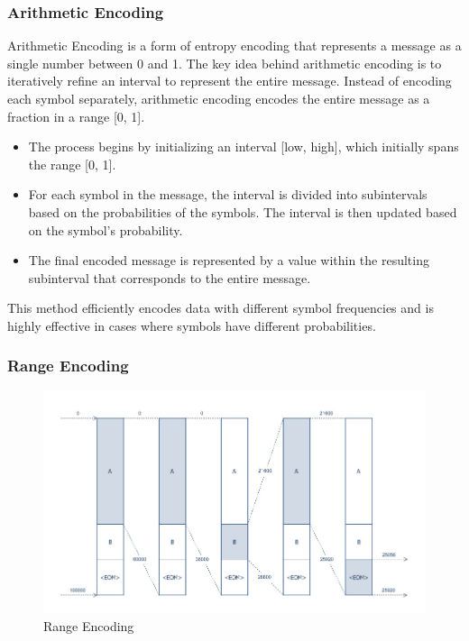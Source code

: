     \subsubsection{Arithmetic Encoding}
    Arithmetic Encoding is a form of entropy encoding that represents a message as a single number between 0 and 1. The key idea behind arithmetic encoding is to iteratively refine an interval to represent the entire message. Instead of encoding each symbol separately, arithmetic encoding encodes the entire message as a fraction in a range [0, 1].

    \begin{itemize}
        \item The process begins by initializing an interval [low, high], which initially spans the range [0, 1].
        \item For each symbol in the message, the interval is divided into subintervals based on the probabilities of the symbols. The interval is then updated based on the symbol's probability.
        \item The final encoded message is represented by a value within the resulting subinterval that corresponds to the entire message.
    \end{itemize}

    This method efficiently encodes data with different symbol frequencies and is highly effective in cases where symbols have different probabilities.

    \subsubsection{Range Encoding}

    \begin{figure}[H]
        \centering
        \includegraphics[width=0.95\linewidth]{assets/Range_encoding.jpg}
        \caption{Range Encoding}
        \label{fig:range_encoding}
    \end{figure}

